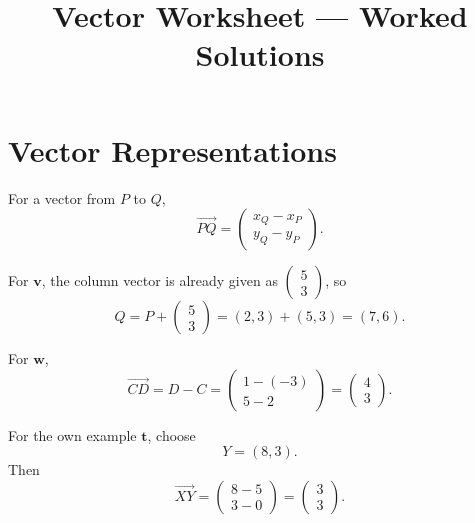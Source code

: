 \documentclass[12pt,a4paper]{article}
\title{Vector Worksheet --- Worked Solutions}
\author{}
\date{}
\begin{document}
\maketitle
\thispagestyle{empty}

\section*{Vector Representations}

For a vector from \(P\) to \(Q\),
\[
\overrightarrow{PQ}
=
\begin{pmatrix}
x_Q-x_P\\
y_Q-y_P
\end{pmatrix}.
\]

For \(\mathbf{v}\), the column vector is already given as
\(\begin{pmatrix}5\\3\end{pmatrix}\), so
\[
Q=P+\begin{pmatrix}5\\3\end{pmatrix}
=(2,3)+(5,3)=(7,6).
\]

For \(\mathbf{w}\),
\[
\overrightarrow{CD}
=
D-C
=
\begin{pmatrix}1-(-3)\\5-2\end{pmatrix}
=
\begin{pmatrix}4\\3\end{pmatrix}.
\]

For the own example \(\mathbf{t}\), choose
\[
Y=(8,3).
\]
Then
\[
\overrightarrow{XY}
=
\begin{pmatrix}8-5\\3-0\end{pmatrix}
=
\begin{pmatrix}3\\3\end{pmatrix}.
\]
\end{document}
